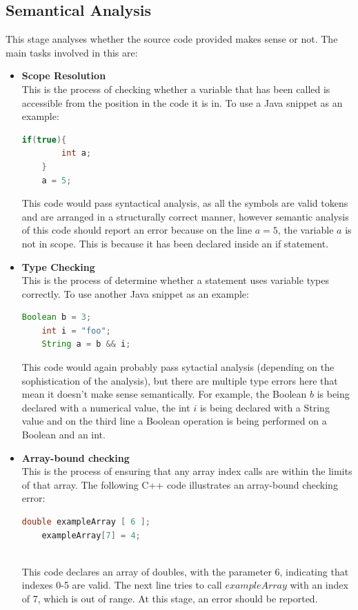 \documentclass[ %
                    author={Jonathan Rankin},
                supervisor={Dr. David May, Dr. Ian Holyer},
                    degree={MEng},
                     title={CodeTouch},
                  subtitle={A Revolutionary Way To Program Real Code On Touch Screen Devices},
                      type={enterprise},
                      year={2015 } ]{dissertation}
\begin{document}
\subsection{Semantical Analysis}
This stage analyses whether the source code provided makes sense or not. The main tasks involved in this are:
\begin{itemize}
\item \textbf{Scope Resolution} \\ This is the process of checking whether a variable that has been called is accessible from the position in the code it is in. To use a Java snippet as an example:
\begin{lstlisting}[language=Java]
    if(true){
        int a;
    }
    a = 5;
\end{lstlisting}
This code would pass syntactical analysis, as all the symbols are valid tokens and are arranged in a structurally correct manner, however semantic analysis of this code should report an error because on the line $a = 5$, the variable $a$ is not in scope. This is because it has been declared inside an if statement.
\\
\item \textbf{Type Checking} \\ This is the process of determine whether a statement uses variable types correctly. To use another Java snippet as an example:
\begin{lstlisting}[language=Java]
    Boolean b = 3;
    int i = "foo";
    String a = b && i;
\end{lstlisting}

This code would again probably pass sytactial analysis (depending on the sophistication of the analysis), but there are multiple type errors here that mean it doesn't make sense semantically. For example, the Boolean $b$ is being declared with a numerical value, the int $i$ is being declared with a String value and on the third line a Boolean operation is being performed on a Boolean and an int.
\\
\item \textbf{Array-bound checking} \\ This is the process of ensuring that any array index calls are within the limits of that array. The following C++ code illustrates an array-bound checking error:
\begin{lstlisting}[language=Java]
    double exampleArray [ 6 ];
    exampleArray[7] = 4;
    
\end{lstlisting}

This code declares an array of doubles, with the parameter 6, indicating that indexes 0-5 are valid. The next line tries to call $exampleArray$ with an index of 7, which is out of range. At this stage, an error should be reported.  


\end{itemize}
\end{document}
